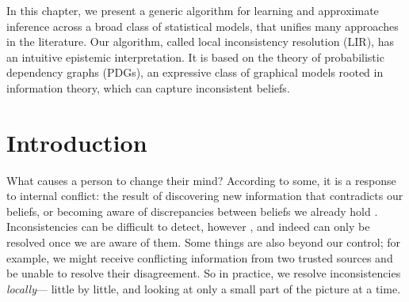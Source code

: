     \label{chap:LIR}

In this chapter, 
we present a generic algorithm
    for learning and
    approximate inference
    across a broad class of statistical models,
    that unifies many approaches in the literature.
Our algorithm,
    called local inconsistency resolution (LIR),
    has an intuitive epistemic interpretation.
It is based on the theory of
    probabilistic dependency graphs (PDGs),
    an expressive class of graphical models
        rooted in information theory,
        which can capture inconsistent beliefs.

\section{Introduction}
What causes a person to change their mind?
According to some,
    it is a response to internal conflict:
    the result of
    discovering new information that contradicts our beliefs, or
    becoming aware of discrepancies between beliefs we already hold
    \cite{festinger1962cognitive}.
Inconsistencies
    can be difficult to detect, however
    \cite{selman1996generating}, and indeed can only
    be resolved once we are aware of them.
Some things are also
 beyond our control;
    for example, we might receive conflicting information
        from two trusted sources and be unable to resolve
        their disagreement.
So in practice, we resolve inconsistencies \emph{locally}---%
    little by little, and looking at
        only a small part of the picture at a time.


